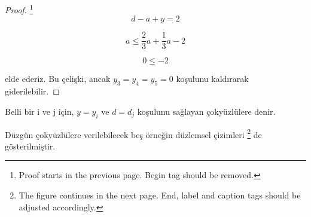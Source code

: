 \documentclass[11pt]{amsbook}
\begin{document}
\begin{proof} \footnote{Proof starts in the previous page. Begin tag should be removed.}
	$$ d - a + y = 2 $$

	$$a \leqslant \frac{2}{3} a + \frac{1}{3} a - 2$$

	$$0 \leqslant -2$$

	elde ederiz. Bu çelişki, ancak $y_3 = y_4 = y_5 = 0$
	koşulunu kaldırarak giderilebilir.
\end{proof}

\begin{definition}
	Belli bir i ve j için,
	$y=y_i$ ve $d=d_j$
	koşulunu sağlayan çokyüzlülere
	 denir.
\end{definition}

Düzgün çokyüzlülere verilebilecek beş örneğin
düzlemsel çizimleri  \footnote{The figure continues in the next page. 
									End, label and caption tags should be adjusted accordingly.}
de gösterilmiştir.

\begin{figure}[htb]
	\centering
	\hspace*{0.15\linewidth} %
	\label{fig:DuzgunCokyuzluler}
\end{figure}

\end{document}
